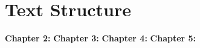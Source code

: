 	\section{Text Structure} 
	\textbf{Chapter 2:}
	\textbf{Chapter 3:}
	\textbf{Chapter 4:}
	\textbf{Chapter 5:}
